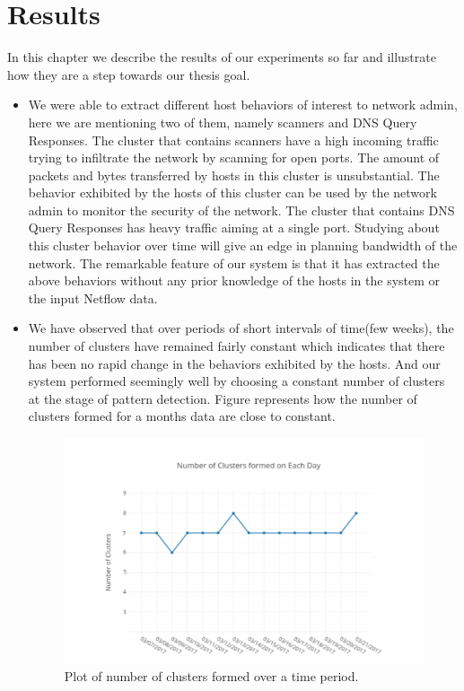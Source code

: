 
\chapter{Results}

In this chapter we describe the results of our experiments so far and illustrate how they are a step towards our thesis goal.


\begin{itemize}

\item We were able to extract different host behaviors of interest to network admin, here
we are mentioning two of them, namely scanners and DNS Query Responses. The
cluster that contains scanners have a high incoming traffic trying to infiltrate the
network by scanning for open ports. The amount of packets and bytes transferred
by hosts in this cluster is unsubstantial. The behavior exhibited by the hosts of this
cluster can be used by the network admin to monitor the security of the network.
The cluster that contains DNS Query Responses has heavy traffic aiming at a single
port. Studying about this cluster behavior over time will give an edge in planning
bandwidth of the network. The remarkable feature of our system is that it has extracted
the above behaviors without any prior knowledge of the hosts in the system
or the input Netflow data.

\item We have observed that over periods of short intervals of time(few weeks), the number
of clusters have remained fairly constant which indicates that there has been no
rapid change in the behaviors exhibited by the hosts. And our system performed
seemingly well by choosing a constant number of clusters at the stage of pattern
detection. Figure  represents how the number of clusters formed for a months
data are close to constant.

\begin{figure}[ht]
	\centerline{\includegraphics{constant.png}}
	\caption{ Plot of number of clusters formed over a time period.}%
\end{figure} 


\end{itemize}
